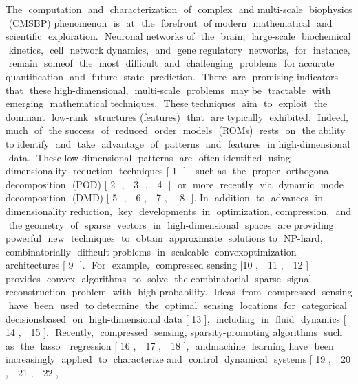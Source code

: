 \documentclass{article}
\begin{document}
The​ ​ computation​ ​ and​ ​ characterization​ ​ of​ ​ complex​ ​ and​ ​ multi-scale​ ​ biophysics​ ​ (CMSBP)
phenomenon​ ​ is​ ​ at​ ​ the​ ​ forefront​ ​ of​ ​ modern​ ​ mathematical​ ​ and​ ​ scientific​ ​ exploration.​ ​ Neuronal
networks​ ​ of​ ​ the​ ​ brain,​ ​ large-scale​ ​ biochemical​ ​ kinetics,​ ​ cell​ ​ network​ ​ dynamics,​ ​ and​ ​ gene
regulatory​ ​ networks,​ ​ for​ ​ instance,​ ​ remain​ ​ some​ ​ of​ ​ the​ ​ most​ ​ difficult​ ​ and​ ​ challenging​ ​ problems​ ​ for
accurate​ ​ quantification​ ​ and​ ​ future​ ​ state​ ​ prediction.​ ​ There​ ​ are​ ​ promising​ ​ indicators​ ​ that​ ​ these
high-dimensional,​ ​ multi-scale​ ​ problems​ ​ may​ ​ be​ ​ tractable​ ​ with​ ​ emerging​ ​ mathematical
techniques.​ ​ These​ ​ techniques​ ​ aim​ ​ to​ ​ exploit​ ​ the​ ​ dominant​ ​ low-rank​ ​ structures​ ​ (features)​ ​ that​ ​ are
typically​ ​ exhibited.​ ​ Indeed,​ ​ much​ ​ of​ ​ the​ ​ success​ ​ of​ ​ reduced​ ​ order​ ​ models​ ​ (ROMs)​ ​ rests​ ​ on​ ​ the
ability​ ​ to​ ​ identify​ ​ and​ ​ take​ ​ advantage​ ​ of​ ​ patterns​ ​ and​ ​ features​ ​ in​ ​ high-dimensional​ ​ data.​ ​ These
low-dimensional​ ​ patterns​ ​ are​ ​ often​ ​ identified​ ​ using​ ​ dimensionality​ ​ reduction​ ​ techniques [​ 1 ​ ] ​ ​ such
as​ ​ the​ ​ proper​ ​ orthogonal​ ​ decomposition​ ​ (POD) [​ 2 ​ , ​ ​ 3 ​ , ​ ​ 4 ​ ] ​ ​ or​ ​ more​ ​ recently​ ​ via​ ​ dynamic​ ​ mode
decomposition​ ​ (DMD) [​ 5 ​ , ​ ​ 6 ​ , ​ ​ 7 , ​ ​ ​ 8 ​ ].
In​ ​ addition​ ​ to​ ​ advances​ ​ in​ ​ dimensionality​ ​ reduction,​ ​ key​ ​ developments​ ​ in​ ​ optimization,
compression,​ ​ and​ ​ the​ ​ geometry​ ​ of​ ​ sparse​ ​ vectors​ ​ in​ ​ high-dimensional​ ​ spaces​ ​ are​ ​ providing
powerful​ ​ new​ ​ techniques​ ​ to​ ​ obtain​ ​ approximate​ ​ solutions​ ​ to​ ​ NP-hard,​ ​ combinatorially​ ​ difficult
problems​ ​ in​ ​ scaleable​ ​ convex​ ​ optimization​ ​ architectures [​ 9 ​ ].​ ​ For​ ​ example,​ ​ compressed
sensing [​ 10​ , ​ ​ 11​ , ​ ​ 12​ ] ​ ​ provides​ ​ convex​ ​ algorithms​ ​ to​ ​ solve​ ​ the​ ​ combinatorial​ ​ sparse​ ​ signal
reconstruction​ ​ problem​ ​ with​ ​ high​ ​ probability.​ ​ Ideas​ ​ from​ ​ compressed​ ​ sensing​ ​ have​ ​ been​ ​ used​ ​ to
determine​ ​ the​ ​ optimal​ ​ sensing​ ​ locations​ ​ for​ ​ categorical​ ​ decisions​ ​ based​ ​ on​ ​ high-dimensional
data [​ 13​ ],​ ​ including​ ​ in​ ​ fluid​ ​ dynamics [​ 14​ , ​ ​ 15​ ].​ ​ Recently,​ ​ compressed​ ​ sensing,
sparsity-promoting​ ​ algorithms​ ​ such​ ​ as​ ​ the​ ​ lasso ​ ​ regression [​ 16​ , ​ ​ 17​ , ​ ​ 18​ ],​ ​ and​ ​ machine​ ​ learning
have​ ​ been​ ​ increasingly​ ​ applied​ ​ to​ ​ characterize​ ​ and​ ​ control​ ​ dynamical​ ​ systems [​ 19​ , ​ ​ 20​ , ​ ​ 21​ , ​ ​ 22​ ,
\end{document}
